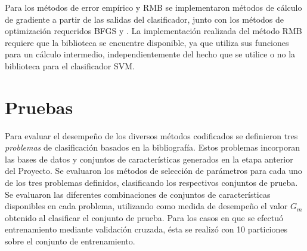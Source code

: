 \documentclass[12pt,bibliography=oldstyle,DIV=12,parskip=half-]{scrreprt}
\begin{document}
Para los métodos de error empírico y RMB se implementaron métodos de
cálculo de gradiente a partir de las salidas del clasificador, junto
con los métodos de optimización requeridos BFGS \cite{nocedal} y
 \cite{linesearch}.
La implementación realizada del método RMB requiere que la biblioteca
 se encuentre disponible, ya que utiliza sus funciones para
un cálculo intermedio, independientemente del hecho que se utilice o no
la biblioteca para el clasificador SVM.
%
%
\section{Pruebas}
%
Para evaluar el desempeño de los diversos métodos codificados se
definieron tres \emph{problemas} de clasificación basados en la
bibliografía. Estos problemas incorporan las bases de datos y
conjuntos de características generados en la etapa anterior del
Proyecto.  Se evaluaron los métodos de selección de parámetros para
cada uno de los tres problemas definidos, clasificando los respectivos
conjuntos de prueba. Se evaluaron las diferentes combinaciones de
conjuntos de características disponibles en cada problema, utilizando
como medida de desempeño el valor $G_m$ obtenido al clasificar el
conjunto de prueba.  Para los casos en que se efectuó entrenamiento
mediante validación cruzada, ésta se realizó con 10 particiones sobre
el conjunto de entrenamiento.
%
%
\end{document}
